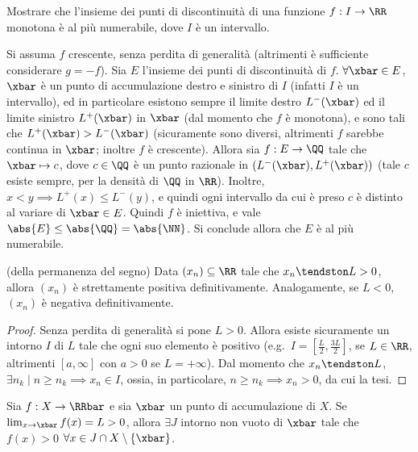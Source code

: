 \documentclass[11pt]{article}
\begin{document}
	\begin{exercise}
		Mostrare che l'insieme dei punti di discontinuità di una funzione $f : I \to \RR$ monotona è al più
		numerabile, dove $I$ è un intervallo.
	\end{exercise}

	\begin{solution}
		Si assuma $f$ crescente, senza perdita di generalità (altrimenti è sufficiente considerare $g = -f$).
		Sia $E$ l'insieme dei punti di discontinuità di $f$. $\forall \xbar \in E$, $\xbar$ è un punto di accumulazione
		destro e sinistro di $I$ (infatti $I$ è un intervallo), ed in particolare esistono sempre il limite destro $L^-(\xbar)$
		ed il limite sinistro $L^+(\xbar)$ in $\xbar$ (dal momento che $f$ è monotona), e sono tali che $L^+(\xbar) > L^-(\xbar)$ (sicuramente
		sono diversi, altrimenti
		$f$ sarebbe continua in $\xbar$; inoltre $f$ è crescente). Allora sia $f : E \to \QQ$ tale che $\xbar \mapsto c$, dove $c \in \QQ$ è
		un punto razionale in $(L^-(\xbar), L^+(\xbar))$ (tale $c$ esiste sempre, per la densità di $\QQ$ in $\RR$).
		Inoltre, $x < y \implies L^+(x) \leq L^-(y)$, e quindi ogni intervallo da cui è preso $c$ è distinto al variare
		di $\xbar \in E$. Quindi $f$ è iniettiva, e vale $\abs{E} \leq \abs{\QQ} = \abs{\NN}$. Si conclude allora
		che $E$ è al più numerabile.
	\end{solution}
	
	\begin{theorem} (della permanenza del segno)
		Data $(x_n) \subseteq \RR$ tale che $x_n \tendston L > 0$, allora
		$(x_n)$ è strettamente positiva definitivamente. Analogamente, se $L < 0$,
		$(x_n)$ è negativa definitivamente.
	\end{theorem}

	\begin{proof}
		Senza perdita di generalità si pone $L > 0$. Allora esiste sicuramente un intorno $I$ di $L$ tale che ogni suo elemento è positivo (e.g.~$I = [\frac{L}{2}, \frac{3L}{2}]$, se $L \in \RR$, altrimenti $[a, \infty]$ con $a > 0$ se $L = +\infty$). Dal momento che $x_n \tendston L$, $\exists n_k \mid n \geq n_k \implies x_n \in I$,
		ossia, in particolare, $n \geq n_k \implies x_n > 0$, da cui la tesi.
	\end{proof}

	\begin{proposition}
		Sia $f : X \to \RRbar$ e sia $\xbar$ un punto di accumulazione di $X$. Se $\lim_{x \to \xbar} f(x) = L > 0$,
		allora $\exists J$ intorno non vuoto di $\xbar$ tale che $f(x) > 0$ $\forall x \in J \cap X \setminus \{\xbar\}$.
	\end{proposition}
\end{document}
